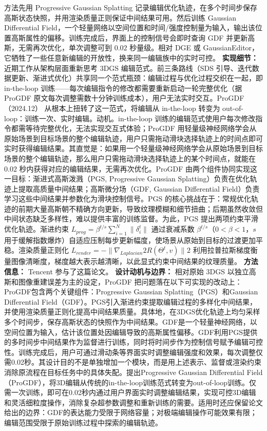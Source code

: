 方法先用 Progressive Gaussian Splatting 记录编辑优化轨迹，在多个时间步保存高斯状态快照，并用渲染质量正则保证中间结果可用。然后训练 Gaussian Differential Field，一个轻量网络以空间位置和时间/强度控制量为输入，输出该位置高斯属性的偏移。训练完成后，界面上的控制信号会即时查询 GDF 并更新高斯，无需再次优化，单次调整可到 $0.02$ 秒量级。相对 DGE 或 GaussianEditor，它牺牲了一些任意新编辑的开放性，换来同一编辑族中的实时可控。
\textbf{实现细节：} 近期工作从架构层面重新思考 3DGS 编辑范式。前三条路线（SDS 引导、迭代数据更新、渐进式优化）共享同一个范式瓶颈：编辑过程与优化过程交织在一起，即 in-the-loop 训练——每次编辑指令的修改都需要重新启动一轮完整优化（据 ProGDF 原文每次调整需数十分钟训练成本），用户无法实时交互。ProGDF（2024.12） 从根本上扭转了这一范式，将编辑从 in-the-loop 转变为 out-of-loop：训练一次、实时编辑。动机。in-the-loop 训练的编辑范式使用户每次修改指令都需等待完整优化，无法实现交互式体验；ProGDF 用轻量级神经网络学会从原始场景到目标场景的整个编辑轨迹，用户只需拖动滑块选择轨迹上的时间点即可实时获得编辑结果。其直觉是：如果用一个轻量级神经网络学会从原始场景到目标场景的整个编辑轨迹，那么用户只需拖动滑块选择轨迹上的某个时间点，就能在 $0.02$ 秒内获得对应的编辑结果，无需再次优化。ProGDF 由两个组件协同实现这一目标：渐进式高斯泼溅（PGS, Progressive Gaussian Splatting）负责在优化轨迹上提取高质量中间结果；高斯微分场（GDF, Gaussian Differential Field）负责学习这些中间结果并参数化为滑块控制信号。PGS 的核心挑战在于：常规优化轨迹的前期大量高斯朝不精确方向更新，导致纹理模糊和细节扭曲；后期虽然收敛但中间状态缺乏多样性，难以提供丰富的训练监督。为此，PGS 提出两项约束平滑优化轨迹。渐进约束 $L_{prog} = \beta^{t/s}\sum_{i=1}^{N}\|\delta_i^t\|$ 通过衰减系数 $\beta^{t/s}$（$0<\beta<1$，$s$ 用于缓解指数爆炸）自适应压制每步更新幅度，使场景从原始到目标的过渡更加平稳。渲染质量正则化 $L_{render} = -\|\nabla_{Laplacian}^{}2 R(\Theta^t,v)\|^{}2$ 利用拉普拉斯梯度衡量图像清晰度，梯度越大表示越清晰，以此显式约束中间结果的纹理质量。
\textbf{方法信息：} Tencent 参与了这篇论文。
\textbf{设计动机与边界：} 相对原始 3DGS 以独立高斯和图像重建误差为主的设定，ProGDF 把问题落在以下可实现的改动上：ProGDF包含两个关键组件：Progressive Gaussian Splatting（PGS）和Gaussian Differential Field（GDF）。PGS引入渐进约束提取编辑过程的多样化中间结果，并使用渲染质量正则化提高中间结果质量。具体地，在3DGS优化轨迹上均匀采样多个时间步，保存高斯状态的快照作为中间结果。GDF是一个轻量神经网络，以空间位置为输入，估计该位置处因编辑导致的高斯属性偏移。GDF利用PGS提供的多时间步中间结果作为监督进行训练，同时将时间步作为控制信号赋予编辑可控性。训练完成后，用户可通过滑动条等界面实时调整编辑强度和效果，每次调整仅需0.02秒。其设计目的不是单独增加一个模块，而是用上述表示、监督或渲染约束消除原流程在目标任务中的具体失配。提出Progressive Gaussian Differential Field（ProGDF），将3D编辑从传统的in-the-loop训练范式转变为out-of-loop训练。仅需一次训练，即可在0.02秒内通过用户界面实时调整编辑结果，实现可控3D编辑和灵活细粒度操作，消除复杂超参数调整和重新训练的需要。适用时还应保留论文给出的边界：GDF的表达能力受限于网络容量；对极端编辑操作可能效果有限；编辑范围受限于原始训练过程中探索的编辑轨迹。
